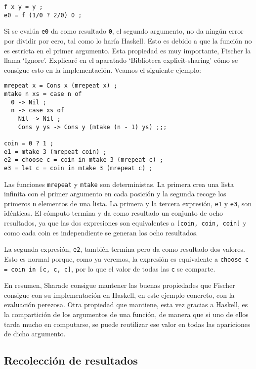 \documentclass[class=article, crop=false]{standalone}
\begin{document}
\begin{verbatim}
f x y = y ;
e0 = f (1/0 ? 2/0) 0 ;
\end{verbatim}

Si se evalúa \verb`e0` da como resultado \verb`0`, el segundo argumento, no da ningún error
por dividir por cero, tal como lo haría Haskell. Esto es debido a que la función no es
estricta en el primer argumento. Esta propiedad es muy importante, Fischer la llama `Ignore'.
Explicaré en el aparatado `Biblioteca explicit-sharing' cómo se consigue esto en la
implementación. Veamos el siguiente ejemplo:

\begin{verbatim}
mrepeat x = Cons x (mrepeat x) ;
mtake n xs = case n of
  0 -> Nil ;
  n -> case xs of
    Nil -> Nil ;
    Cons y ys -> Cons y (mtake (n - 1) ys) ;;;

coin = 0 ? 1 ;
e1 = mtake 3 (mrepeat coin) ;
e2 = choose c = coin in mtake 3 (mrepeat c) ;
e3 = let c = coin in mtake 3 (mrepeat c) ;
\end{verbatim}

Las funciones \verb`mrepeat` y \verb`mtake` son deterministas. La primera crea una lista
infinita con el primer argumento en cada posición y la segunda recoge los primeros \verb`n`
elementos de una lista. La primera y la tercera expresión, \verb`e1` y \verb`e3`, son
idénticas. El cómputo termina y da como resultado un conjunto de ocho resultados, ya que las
dos expresiones son equivalentes a \verb`[coin, coin, coin]` y como cada coin es
independiente se generan los ocho resultados.

La segunda expresión, \verb`e2`, también termina pero da como resultado dos valores. Esto es
normal porque, como ya veremos, la expresión es equivalente a
\verb`choose c = coin in [c, c, c]`, por lo que el valor de todas las \verb`c` se comparte.

En resumen, Sharade consigue mantener las buenas propiedades que Fischer consigue con su
implementación en Haskell, en este ejemplo concreto, con la evaluación perezosa. Otra
propiedad que mantiene, esta vez gracias a Haskell, es la compartición de los argumentos de
una función, de manera que si uno de ellos tarda mucho en computarse, se puede reutilizar ese
valor en todas las apariciones de dicho argumento.

\subsection{Recolección de resultados}
\end{document}
